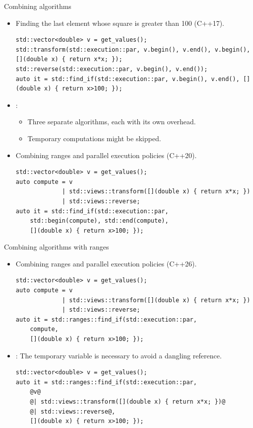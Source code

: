 \begin{frame}[t,fragile]{Combining algorithms}
\begin{itemize}

    \item Finding the last element whose square is greater than 100 (C++17).
\begin{lstlisting}
std::vector<double> v = get_values();
std::transform(std::execution::par, v.begin(), v.end(), v.begin(), [](double x) { return x*x; });
std::reverse(std::execution::par, v.begin(), v.end());
auto it = std::find_if(std::execution::par, v.begin(), v.end(), [](double x) { return x>100; });
\end{lstlisting}

    \item {}:
    \begin{itemize}
        \item Three separate algorithms, each with its own overhead.
        \item Temporary computations might be skipped.
    \end{itemize}

    \item Combining ranges and parallel execution policies (C++20).
    
\begin{lstlisting}
std::vector<double> v = get_values();
auto compute = v 
             | std::views::transform([](double x) { return x*x; })
             | std::views::reverse;
auto it = std::find_if(std::execution::par, 
    std::begin(compute), std::end(compute), 
    [](double x) { return x>100; });
\end{lstlisting}

\end{itemize}
\end{frame}

\begin{frame}[t,fragile]{Combining algorithms with ranges}
\begin{itemize}

    \item Combining ranges and parallel execution policies (C++26).
\begin{lstlisting}
std::vector<double> v = get_values();
auto compute = v 
             | std::views::transform([](double x) { return x*x; })
             | std::views::reverse;
auto it = std::ranges::find_if(std::execution::par, 
    compute, 
    [](double x) { return x>100; });
\end{lstlisting}

     \item {}: The temporary variable  is necessary to avoid a dangling reference. 
\begin{lstlisting}
std::vector<double> v = get_values();
auto it = std::ranges::find_if(std::execution::par, 
    @v@
    @| std::views::transform([](double x) { return x*x; })@
    @| std::views::reverse@,
    [](double x) { return x>100; });
\end{lstlisting}

\end{itemize}
\end{frame}